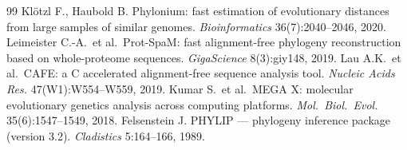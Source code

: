 \documentclass[11pt]{article}
\begin{document}
\begin{thebibliography}{99}
 Kl{\"o}tzl F., Haubold B. Phylonium: fast estimation of evolutionary distances from large samples of similar genomes. \emph{Bioinformatics} 36(7):2040--2046, 2020.
 Leimeister C.-A.\ et al.\ Prot-SpaM: fast alignment-free phylogeny reconstruction based on whole-proteome sequences. \emph{GigaScience} 8(3):giy148, 2019.
 Lau A.K.\ et al.\ CAFE: a C accelerated alignment-free sequence analysis tool. \emph{Nucleic Acids Res.} 47(W1):W554--W559, 2019.
 Kumar S.\ et al.\ MEGA X: molecular evolutionary genetics analysis across computing platforms. \emph{Mol.\ Biol.\ Evol.} 35(6):1547--1549, 2018.
 Felsenstein J. PHYLIP --- phylogeny inference package (version 3.2). \emph{Cladistics} 5:164--166, 1989.
\end{thebibliography}
\end{document}
